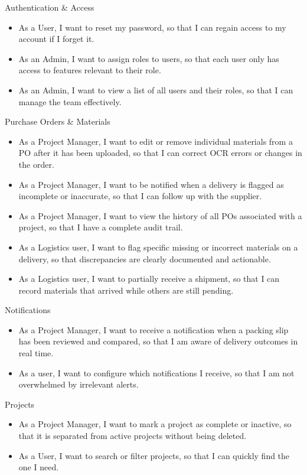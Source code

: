 \documentclass{article}
\begin{document}
Authentication & Access
\begin{itemize}
    \item As a User, I want to reset my password, so that I can regain access to my account if I forget it.
    \item As an Admin, I want to assign roles to users, so that each user only has access to features relevant to their role.
    \item As an Admin, I want to view a list of all users and their roles, so that I can manage the team effectively.
\end{itemize}

Purchase Orders \& Materials
\begin{itemize}
    \item As a Project Manager, I want to edit or remove individual materials from a PO after it has been uploaded, so that I can correct OCR errors or changes in the order.
    \item As a Project Manager, I want to be notified when a delivery is flagged as incomplete or inaccurate, so that I can follow up with the supplier.
    \item As a Project Manager, I want to view the history of all POs associated with a project, so that I have a complete audit trail.
    \item As a Logistics user, I want to flag specific missing or incorrect materials on a delivery, so that discrepancies are clearly documented and actionable.
    \item As a Logistics user, I want to partially receive a shipment, so that I can record materials that arrived while others are still pending.
\end{itemize}

Notifications
\begin{itemize}
    \item As a Project Manager, I want to receive a notification when a packing slip has been reviewed and compared, so that I am aware of delivery outcomes in real time.
    \item As a user, I want to configure which notifications I receive, so that I am not overwhelmed by irrelevant alerts.
\end{itemize}
 
Projects
\begin{itemize}
    \item As a Project Manager, I want to mark a project as complete or inactive, so that it is separated from active projects without being deleted.
    \item As a User, I want to search or filter projects, so that I can quickly find the one I need.
\end{itemize}
 
\end{document}
